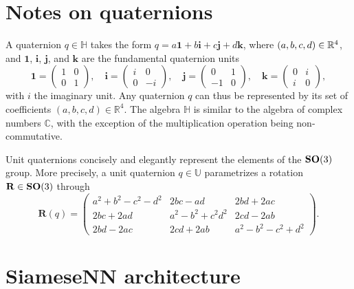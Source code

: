 \section{Notes on quaternions}\label{sec:quaternions}

A quaternion $q\in\mathbb{H}$ takes the form
$q =  a\boldsymbol{1} + b\boldsymbol{i} + c\boldsymbol{j} + d\boldsymbol{k}$,
where $(a,b,c,d) \in \mathbb{R}^4$, and $\boldsymbol{1}$, $\boldsymbol{i}$, $\boldsymbol{j}$, and $\boldsymbol{k}$ are the fundamental quaternion units
\begin{equation*}
    \boldsymbol{1} = \begin{pmatrix} 1 & 0 \\ 0 & 1 \end{pmatrix}, \quad
    \boldsymbol{i} = \begin{pmatrix} i & 0 \\ 0 & -i \end{pmatrix}, \quad
    \boldsymbol{j} = \begin{pmatrix} 0 & 1 \\ -1 & 0 \end{pmatrix}, \quad
    \boldsymbol{k} = \begin{pmatrix} 0 & i \\ i & 0 \end{pmatrix},
\end{equation*}
with $i$ the imaginary unit.
Any quaternion $q$ can thus be represented by its set of coefficients $(a,b,c,d)\in\mathbb{R}^4$.
The algebra $\mathbb{H}$ is similar to the algebra of complex numbers $\mathbb{C}$, with the exception of the multiplication operation being non-commutative.

Unit quaternions concisely and elegantly represent the elements of the $\mathrm{\mathbf{SO}}(3)$ group.
More precisely, a unit quaternion $q\in\mathbb{U}$ parametrizes a rotation $\mathbf{R}\in\mathrm{\mathbf{SO}}(3)$ through
\begin{equation*}
    \mathbf{R}(q) = \begin{pmatrix}
    a^2+b^2-c^2-d^2 & 2bc-ad & 2bd+2ac \\
    2bc+2ad & a^2-b^2+c^2d^2 & 2cd-2ab \\
    2bd-2ac & 2cd+2ab & a^2-b^2-c^2+d^2
    \end{pmatrix}.
\end{equation*}

\newpage
\section{SiameseNN architecture}\label{sec:siamese-architecture}


